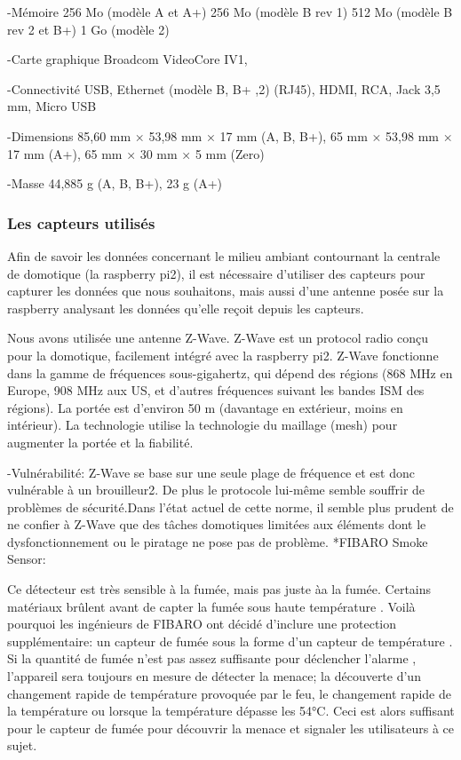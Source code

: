 -Mémoire 	256 Mo (modèle A et A+)
256 Mo (modèle B rev 1)
512 Mo (modèle B rev 2 et B+)
1 Go (modèle 2)


-Carte graphique 	Broadcom VideoCore IV1,


-Connectivité 	USB, Ethernet (modèle B, B+ ,2) (RJ45), HDMI, RCA, Jack 3,5 mm, Micro USB


-Dimensions 	85,60 mm × 53,98 mm × 17 mm (A, B, B+),
65 mm × 53,98 mm × 17 mm (A+),
65 mm × 30 mm × 5 mm (Zero)


-Masse 	44,885 g (A, B, B+), 23 g (A+)

\subsubsection{Les capteurs utilisés}
Afin de savoir les données concernant le milieu ambiant contournant la centrale de domotique (la raspberry pi2), il est nécessaire d'utiliser des capteurs pour capturer les données que nous souhaitons, mais aussi d'une antenne posée sur la raspberry analysant les données qu'elle reçoit depuis les capteurs.

Nous avons utilisée une antenne Z-Wave. Z-Wave est un protocol radio conçu pour la domotique, facilement intégré avec la raspberry pi2. Z-Wave fonctionne dans la gamme de fréquences sous-gigahertz, qui dépend des régions (868 MHz en Europe, 908 MHz aux US, et d'autres fréquences suivant les bandes ISM des régions). La portée est d'environ 50 m (davantage en extérieur, moins en intérieur). La technologie utilise la technologie du maillage (mesh) pour augmenter la portée et la fiabilité.

-Vulnérabilité:
Z-Wave se base sur une seule plage de fréquence et est donc vulnérable à un brouilleur2. De plus le protocole lui-même semble souffrir de problèmes de sécurité.Dans l'état actuel de cette norme, il semble plus prudent de ne confier à Z-Wave que des tâches domotiques limitées aux éléments dont le dysfonctionnement ou le piratage ne pose pas de problème.
*FIBARO Smoke Sensor:

Ce détecteur est très sensible à la fumée, mais pas juste àa la fumée. Certains matériaux brûlent avant de capter la fumée sous haute température . Voilà pourquoi les ingénieurs de  FIBARO ont décidé d'inclure une protection supplémentaire: un capteur de fumée sous la forme d'un capteur de température . Si la quantité de fumée n'est pas assez suffisante pour déclencher l'alarme , l'appareil sera toujours en mesure de détecter la menace; la découverte d'un changement rapide de température provoquée par le feu, le changement rapide de la température ou lorsque la température dépasse les 54°C. Ceci est alors suffisant pour le capteur de fumée pour découvrir la menace et signaler les utilisateurs à ce sujet. 


